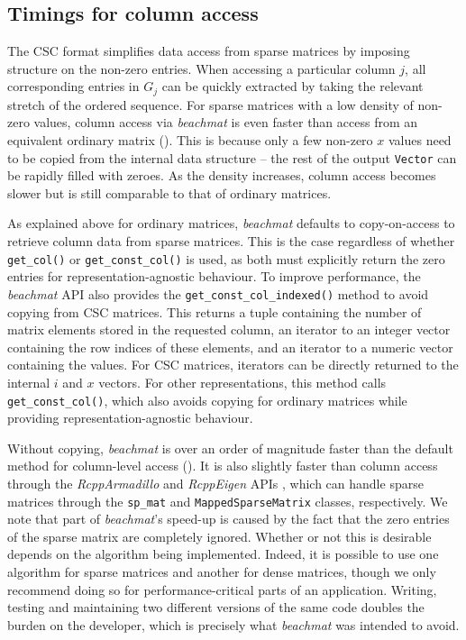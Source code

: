 \documentclass{article}
\newcommand{\beachmat}{\textit{beachmat}}
\newcommand{\code}[1]{\texttt{#1}}
\begin{document}
\subsection{Timings for column access}
The CSC format simplifies data access from sparse matrices by imposing structure on the non-zero entries.
When accessing a particular column $j$, all corresponding entries in $G_j$ can be quickly extracted by taking the relevant stretch of the ordered sequence.
For sparse matrices with a low density of non-zero values, column access via \beachmat{} is even faster than access from an equivalent ordinary matrix (\suppfigsparsecol{}).
This is because only a few non-zero $x$ values need to be copied from the internal data structure -- the rest of the output \code{Vector} can be rapidly filled with zeroes.
As the density increases, column access becomes slower but is still comparable to that of ordinary matrices.

As explained above for ordinary matrices, \beachmat{} defaults to copy-on-access to retrieve column data from sparse matrices.
This is the case regardless of whether \code{get\_col()} or \code{get\_const\_col()} is used, as both must explicitly return the zero entries for representation-agnostic behaviour.
To improve performance, the \beachmat{} API also provides the \code{get\_const\_col\_indexed()} method to avoid copying from CSC matrices.
This returns a tuple containing the number of matrix elements stored in the requested column, an iterator to an integer vector containing the row indices of these elements, and an iterator to a numeric vector containing the values.
For CSC matrices, iterators can be directly returned to the internal $i$ and $x$ vectors.
For other representations, this method calls \code{get\_const\_col()}, which also avoids copying for ordinary matrices while providing representation-agnostic behaviour.

Without copying, \beachmat{} is over an order of magnitude faster than the default method for column-level access (\suppfigsparsecol{}).
It is also slightly faster than column access through the \textit{RcppArmadillo} and \textit{RcppEigen} APIs \cite{eddelbuettel2014arma,bates2013fast}, which can handle sparse matrices through the \code{sp\_mat} and \code{MappedSparseMatrix} classes, respectively.
We note that part of \beachmat{}'s speed-up is caused by the fact that the zero entries of the sparse matrix are completely ignored.
Whether or not this is desirable depends on the algorithm being implemented.
Indeed, it is possible to use one algorithm for sparse matrices and another for dense matrices, though we only recommend doing so for performance-critical parts of an application.
Writing, testing and maintaining two different versions of the same code doubles the burden on the developer, which is precisely what \beachmat{} was intended to avoid.
\end{document}
